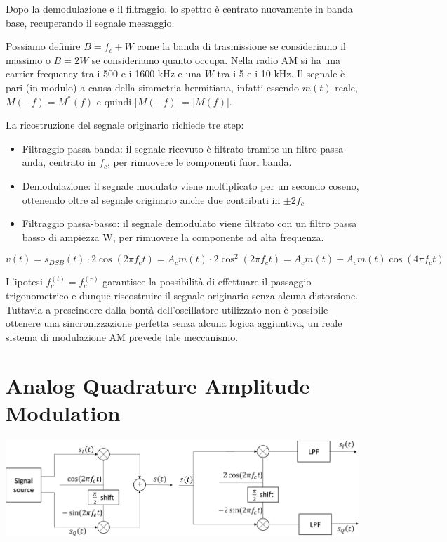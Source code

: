Dopo la demodulazione e il filtraggio, lo spettro è centrato nuovamente in banda base, recuperando il segnale messaggio.

Possiamo definire $B = f_c + W$ come la banda di trasmissione se consideriamo il massimo o $B = 2W$ se consideriamo quanto occupa.
Nella radio AM si ha una carrier frequency tra i 500 e i 1600 kHz e una $W$ tra i 5 e i 10 kHz.
Il segnale è pari (in modulo) a causa della simmetria hermitiana, infatti essendo $m(t)$ reale, $M(-f) = M^*(f)$ e quindi $|M(-f)| = |M(f)|$.


La ricostruzione del segnale originario richiede tre step:
\begin{itemize}
  \item Filtraggio passa-banda: il segnale ricevuto è filtrato tramite un filtro passa-anda, centrato in \( f_c \), per rimuovere le componenti fuori banda.
  \item Demodulazione: il segnale modulato viene moltiplicato per un secondo coseno, ottenendo oltre al segnale originario anche due contributi in \(\pm 2f_c \)
  \item Filtraggio passa-basso: il segnale demodulato viene filtrato con un filtro passa basso di ampiezza W, per rimuovere la componente ad alta frequenza.
\end{itemize}

\begin{equation*}
    v(t) = s_{DSB}(t) \cdot 2\cos(2\pi f_c t) = A_c m(t) \cdot 2\cos^2(2\pi f_c t) = A_c m(t) + A_c m(t) \cos(4\pi f_c t)
\end{equation*}

L'ipotesi $f_c^{(t)} = f_c^{(r)}$ garantisce la possibilità di effettuare il passaggio trigonometrico e dunque riscostruire il segnale originario senza alcuna distorsione. Tuttavia a prescindere dalla bontà dell'oscillatore utilizzato non è possibile ottenere una sincronizzazione perfetta senza alcuna logica aggiuntiva, un reale sistema di modulazione AM prevede tale meccanismo.

\section*{Analog Quadrature Amplitude Modulation}

\begin{center}
    \includegraphics[width=1\textwidth]{imgs/analog_qam.png}
\end{center}

















